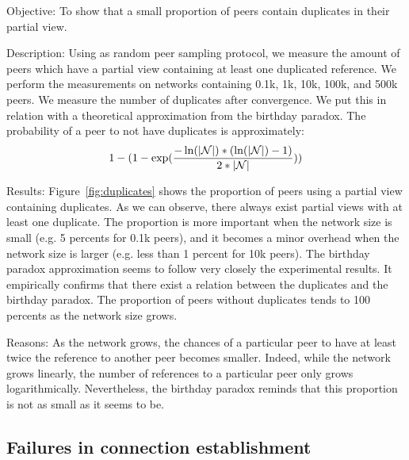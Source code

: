 \begin{asparadesc} 
\item[Objective:] To show that a small proportion of peers contain duplicates
  in their partial view.
\item[Description:] Using \SCAMP as random peer sampling protocol, we measure
  the amount of peers which have a partial view containing at least one
  duplicated reference. We perform the measurements on networks containing
  0.1k, 1k, 10k, 100k, and 500k peers. We measure the number of duplicates
  after convergence. We put this in relation with a theoretical approximation
  from the birthday paradox. The probability of a peer to not have duplicates
  is approximately:
  \begin{equation}
    1- 
    (1-
    \exp({-\ln(|\mathcal{N}|)*(\ln(|\mathcal{N}|)-1)\over{2*|\mathcal{N}|}}))
  \end{equation}
\item[Results:] Figure~\ref{fig:duplicates} shows the proportion of peers using
  a partial view containing duplicates. As we can observe, there always exist
  partial views with at least one duplicate. The proportion is more important
  when the network size is small (e.g. 5 percents for 0.1k peers), and it
  becomes a minor overhead when the network size is larger (e.g. less than 1
  percent for 10k peers). The birthday paradox approximation seems to follow
  very closely the experimental results. It empirically confirms that there
  exist a relation between the duplicates and the birthday paradox. The
  proportion of peers without duplicates tends to 100 percents as the network
  size grows.
\item[Reasons:] As the network grows, the chances of a particular peer to have
  at least twice the reference to another peer becomes smaller. Indeed, while
  the network grows linearly, the number of references to a particular peer
  only grows logarithmically. Nevertheless, the birthday paradox reminds that
  this proportion is not as small as it seems to be.
\end{asparadesc}


\subsection{Failures in connection establishment}
\label{subsec:degeneration}

